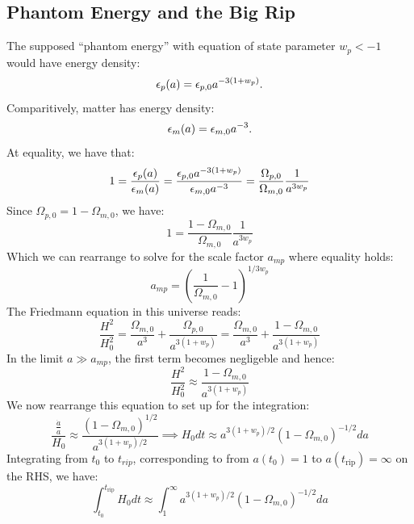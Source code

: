 \subsection{Phantom Energy and the Big Rip}
The supposed ``phantom energy'' with equation of state parameter $w_p < -1$ would have energy density:
\begin{equation}
    \epsilon_p(a) = \epsilon_{p, 0}a^{-3(1+w_p)}.
\end{equation}
Comparitively, matter has energy density:
\begin{equation}
    \epsilon_{m}(a) = \epsilon_{m, 0}a^{-3}.
\end{equation}
At equality, we have that:
\begin{equation}
    1 = \frac{\epsilon_{p}(a)}{\epsilon_{m}(a)} = \frac{\epsilon_{p, 0}a^{-3(1+w_p)}}{\epsilon_{m, 0}a^{-3}} = \frac{\Omega_{p, 0}}{\Omega_{m, 0}}\frac{1}{a^{3w_p}}
\end{equation}
Since $\Omega_{p, 0} = 1 - \Omega_{m, 0}$, we have:
\begin{equation}
    1 = \frac{1 - \Omega_{m, 0}}{\Omega_{m, 0}}\frac{1}{a^{3w_p}}
\end{equation}
Which we can rearrange to solve for the scale factor $a_{mp}$ where equality holds:
\begin{equation}
    \boxed{a_{mp} = \left(\frac{1}{\Omega_{m, 0}} - 1\right)^{1/3w_p}}
\end{equation}
The Friedmann equation in this universe reads:
\begin{equation}
    \frac{H^2}{H_0^2} = \frac{\Omega_{m, 0}}{a^3} + \frac{\Omega_{p, 0}}{a^{3(1+w_p)}} = \frac{\Omega_{m, 0}}{a^3} + \frac{1 - \Omega_{m, 0}}{a^{3(1+w_p)}}
\end{equation}
In the limit $a \gg a_{mp}$, the first term becomes negligeble and hence:
\begin{equation}
    \frac{H^2}{H_0^2} \approx \frac{1 - \Omega_{m, 0}}{a^{3(1+w_p)}}
\end{equation}
We now rearrange this equation to set up for the integration:
\begin{equation}
    \frac{\frac{\dot{a}}{a}}{H_0} \approx \frac{(1 - \Omega_{m, 0})^{1/2}}{a^{3(1+w_p)/2}} \implies H_0 dt \approx a^{3(1+w_p)/2}(1 - \Omega_{m, 0})^{-1/2}da
\end{equation}
Integrating from $t_0$ to $t_{rip}$, corresponding to from $ a(t_0) = 1$ to $a(t_{\text{rip}}) = \infty$ on the RHS, we have:
\begin{equation}
    \int_{t_0}^{t_{\text{rip}}}H_0 dt  \approx \int_1^\infty a^{3(1+w_p)/2}(1 - \Omega_{m, 0})^{-1/2}da
\end{equation}
